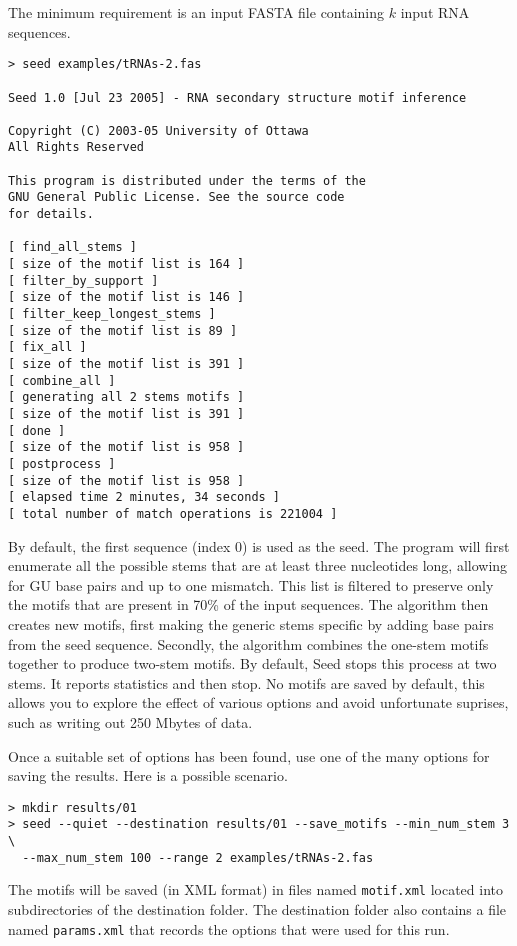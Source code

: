 \documentclass{article}
\begin{document}
The minimum requirement is an input FASTA file containing $k$ input RNA
sequences.
\begin{verbatim}
> seed examples/tRNAs-2.fas

Seed 1.0 [Jul 23 2005] - RNA secondary structure motif inference
                                                                                                    
Copyright (C) 2003-05 University of Ottawa
All Rights Reserved
                                                                                                    
This program is distributed under the terms of the
GNU General Public License. See the source code
for details.
                                                                                                    
[ find_all_stems ]
[ size of the motif list is 164 ]
[ filter_by_support ]
[ size of the motif list is 146 ]
[ filter_keep_longest_stems ]
[ size of the motif list is 89 ]
[ fix_all ]
[ size of the motif list is 391 ]
[ combine_all ]
[ generating all 2 stems motifs ]
[ size of the motif list is 391 ]
[ done ]
[ size of the motif list is 958 ]
[ postprocess ]
[ size of the motif list is 958 ]
[ elapsed time 2 minutes, 34 seconds ]
[ total number of match operations is 221004 ]
\end{verbatim}
By default, the first sequence (index 0) is used as the seed.  The
program will first enumerate all the possible stems that are at least
three nucleotides long, allowing for GU base pairs and up to one
mismatch. This list is filtered to preserve only the motifs that are
present in 70\% of the input sequences.  The algorithm then creates
new motifs, first making the generic stems specific by adding
base pairs from the seed sequence. Secondly, the algorithm combines
the one-stem motifs together to produce two-stem motifs.  By default,
Seed stops this process at two stems.  It reports statistics and then
stop. No motifs are saved by default, this allows you to explore the
effect of various options and avoid unfortunate suprises, such as
writing out 250 Mbytes of data.

Once a suitable set of options has been found, use one of the many
options for saving the results.  Here is a possible scenario.
\begin{verbatim}
> mkdir results/01
> seed --quiet --destination results/01 --save_motifs --min_num_stem 3 \ 
  --max_num_stem 100 --range 2 examples/tRNAs-2.fas
\end{verbatim}
The motifs will be saved (in XML format) in files named
\texttt{motif.xml} located into subdirectories of the destination
folder.  The destination folder also contains a file named
\texttt{params.xml} that records the options that were used for this
run.
\end{document}
